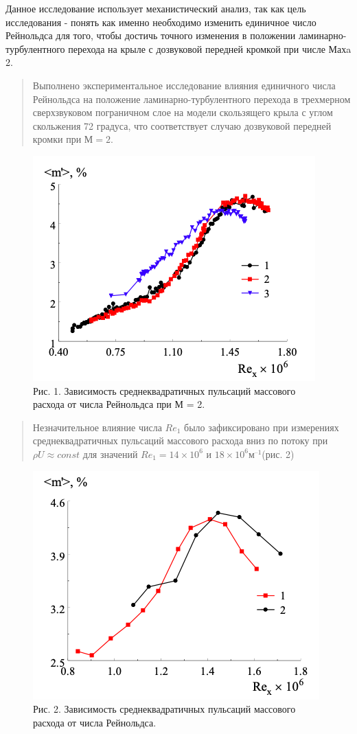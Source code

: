 \documentclass[
]{article}
\begin{document}
Данное исследование использует механистический анализ, так как цель
исследования - понять как именно необходимо изменить единичное число
Рейнольдса для того, чтобы достичь точного изменения в положении
ламинарно-турбулентного перехода на крыле с дозвуковой передней кромкой
при числе Махa 2.

\begin{quote}
Выполнено экспериментальное исследование влияния единичного числа
Рейнольдса на положение ламинарно-турбулентного перехода в трехмерном
сверхзвуковом пограничном слое на модели скользящего крыла с углом
скольжения 72 градуса, что соответствует случаю дозвуковой передней
кромки при \(М = 2\).
\end{quote}

\begin{figure}
\centering
\includegraphics{image1.png}
\caption{Рис. 1. Зависимость среднеквадратичных пульсаций массового
расхода от числа Рейнольдса при М = 2.}
\end{figure}

\begin{quote}
Незначительное влияние числа \(Re_1\) было зафиксировано при измерениях
среднеквадратичных пульсаций массового расхода вниз по потоку при
\(\rho U \approx const\) для значений \(Re_1 = 14 × 10^6\) и
\(18 × 10^6 м^{–1}\)(рис. 2)
\end{quote}

\begin{figure}
\centering
\includegraphics{image2.png}
\caption{Рис. 2. Зависимость среднеквадратичных пульсаций массового
расхода от числа Рейнольдса.}
\end{figure}
\end{document}
